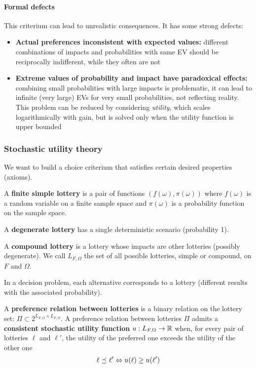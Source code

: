 \paragraph{Formal defects} This criterium can lead to unrealistic consequences. It has some strong defects: 
\begin{itemize}
	\item \textbf{Actual preferences inconsistent with expected values:} different combinations of impacts and probabilities with same EV should be reciprocally indifferent, while they often are not
	
	\item \textbf{Extreme values of probability and impact have paradoxical effects:} combining small probabilities with large impacts is problematic, it can lead to infinite (very large) EVs for very small probabilities, not reflecting reality. This problem can be reduced by considering \textit{utility}, which scales logarithmically with gain, but is solved only when the utility function is upper bounded
\end{itemize}

\subsubsection{Stochastic utility theory}

We want to build a choice criterium that satisfies certain desired properties (axioms). 

A \textbf{finite simple lottery} is a pair of functions $(f(\omega), \pi(\omega))$ where $f(\omega)$ is a random variable on a finite sample space and $\pi(\omega)$ is a probability function on the sample space.

A \textbf{degenerate lottery} has a single deterministic scenario (probability 1). 

A \textbf{compound lottery} is a lottery whose impacts are other lotteries (possibly degenerate). We call $L_{F, \Omega}$ the set of all possible lotteries, simple or compound, on $F$ and $\Omega$.

In a decision problem, each alternative corresponds to a lottery (different results with the associated probability).

A \textbf{preference relation between lotteries} is a binary relation on the lottery set: $\Pi \subset 2^{L_{F, \Omega} \times L_{F, \Omega}}$. A preference relation between lotteries $\Pi$ admits a \textbf{consistent stochastic utility function} $u : L_{F, \Omega} \rightarrow \operatorname{\mathbb{R}}$ when, for every pair of lotteries $\ell$ and $\ell'$, the utility of the preferred one exceeds the utility of the other one
$$ \ell \preceq_{} \ell' \Leftrightarrow u(\ell) \geq u (\ell') $$

